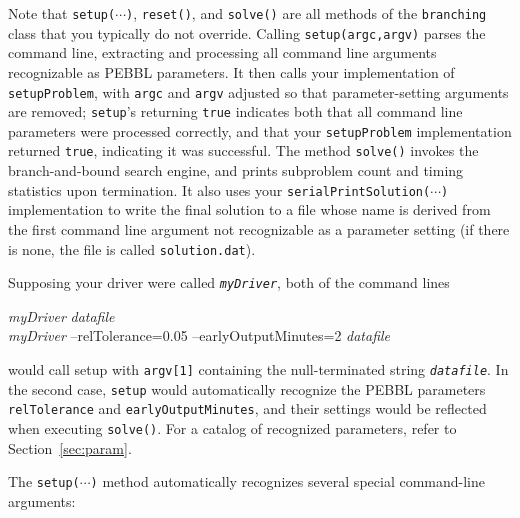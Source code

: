 Note that \texttt{setup($\cdots$)}, \texttt{reset()}, and \texttt{solve()}
are all methods of the \texttt{branching} class that you typically do
not override.  Calling \texttt{setup(argc,argv)} parses the command
line, extracting and processing all command line arguments
recognizable as PEBBL parameters.  It then calls your implementation of
\texttt{setupProblem}, with \texttt{argc} and \texttt{argv} adjusted
so that parameter-setting arguments are removed; \texttt{setup}'s
returning \texttt{true} indicates both that all command line
parameters were processed correctly, and that your
\texttt{setupProblem} implementation returned \texttt{true},
indicating it was successful.  The method \texttt{solve()} invokes the
branch-and-bound search engine, and prints subproblem count and timing
statistics upon termination.  It also uses your
\texttt{serialPrintSolution($\cdots$)} implementation to write the
final solution to a file whose name is derived from the first command
line argument not recognizable as a parameter setting (if there is
none, the file is called \texttt{solution.dat}).

Supposing your driver were called \texttt{\emph{myDriver}}, both of the
command lines
\begin{codeblock}
\emph{myDriver} \emph{datafile} \\
\emph{myDriver} --relTolerance=0.05 --earlyOutputMinutes=2 \emph{datafile}
\end{codeblock}
would call setup with \texttt{argv[1]}  containing the null-terminated
string \texttt{\emph{datafile}}.  In the second case, \texttt{setup} would
automatically recognize the PEBBL parameters \texttt{relTolerance} and
\texttt{earlyOutputMinutes}, and their settings would be reflected
when executing \texttt{solve()}.  For a catalog of recognized
parameters, refer to Section~\ref{sec:param}.  

The \texttt{setup($\cdots$)} method automatically recognizes several
special command-line arguments:

